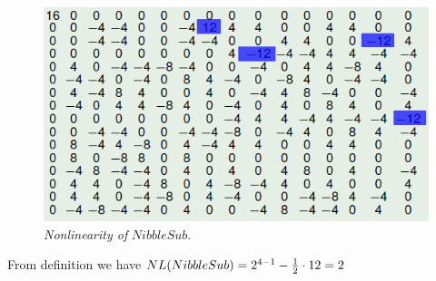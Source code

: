 \begin{example}
\begin{figure}[htbp!]
\centering
\includegraphics{nl}
\caption[Nonlinearity of NibbleSub]{\textit{Nonlinearity of }$NibbleSub$.}
\label{fig:nl}
\end{figure}

From definition we have $\crit{NL}(NibbleSub)=2^{4-1}-\frac{1}{2} \cdot 12 = 2$
\end{example}

